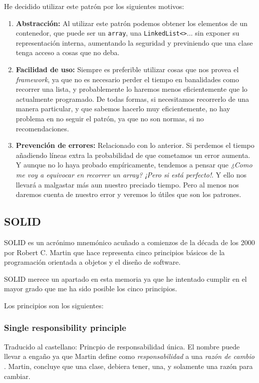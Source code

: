 He decidido utilizar este patr\'{o}n por los siguientes motivos:
\begin{enumerate}
    \item \textbf{Abstracci\'{o}n:}
    Al utilizar este patr\'{o}n podemos obtener los elementos de un contenedor, que puede ser un \texttt{array}, una \texttt{LinkedList<>}... sin
    exponer su representaci\'{o}n interna, aumentando la seguridad y previniendo que una clase tenga acceso a cosas que no deba.
    
    \item \textbf{Facilidad de uso:}
    Siempre es preferible utilizar cosas que nos provea el \emph{framework}, ya que no es necesario perder el tiempo en banalidades como 
    recorrer una lista, y probablemente lo haremos menos eficientemente que lo actualmente programado. De todas formas, si necesitamos
    recorrerlo de una manera particular, y que sabemos hacerlo muy eficientemente, no hay problema en no seguir el patr\'{o}n, ya que no son
    normas, si no recomendaciones.
    
    \item \textbf{Prevenci\'{o}n de errores:}
    Relacionado con lo anterior. Si perdemos el tiempo a\~{n}adiendo l\'{i}neas extra la probabilidad de que cometamos un error aumenta. Y aunque
    no lo haya probado emp\'{i}ricamente, tendemos a pensar que \emph{¿Como me voy a equivocar en recorrer un array? ¡Pero si est\'{a} perfecto!}. 
    Y ello nos llevar\'{a} a malgastar m\'{a}s aun nuestro preciado tiempo. Pero al menos nos daremos cuenta de nuestro error y veremos lo
    \'{u}tiles que son los patrones.
\end{enumerate}

\subsection{SOLID}
SOLID es un acr\'{o}nimo mnem\'{o}nico acu\~{n}ado a comienzos de la d\'{e}cada de los 2000 por Robert C. Martin \cite{bringhurst:elements} 
que hace representa cinco principios b\'{a}sicos de la programaci\'{o}n orientada a objetos y el dise\~{n}o de software.

SOLID merece un apartado en esta memoria ya que he intentado cumplir en el mayor grado que me ha sido posible los cinco principios.

Los principios son los siguientes:
\subsubsection{Single responsibility principle}
Traducido al castellano: Princpio de responsabilidad \'{u}nica. El nombre puede llevar a enga\~{n}o ya que Martin define como \emph{responsabilidad}
a una \emph{raz\'{o}n de cambio} \cite{brunetti-JMMM-2002}. Martin, concluye que una clase, debiera tener, una, y solamente una raz\'{o}n para cambiar.

